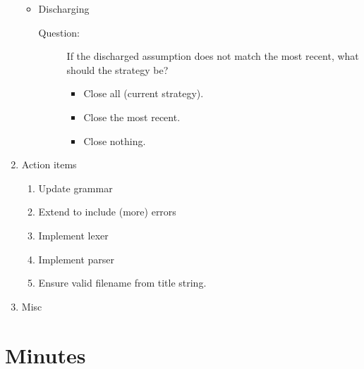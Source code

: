 \documentclass[a4paper]{article}
\begin{document}
\begin{enumerate}
\begin{itemize}
      \item Discharging
        \begin{description}
          \item[Question:] If the discharged assumption does not match the
          most recent, what should the strategy be?
            \begin{itemize}
              \item Close all (current strategy).
              \item Close the most recent.
              \item Close nothing.
            \end{itemize}
        \end{description}
    \end{itemize}
  \item Action items
    \begin{enumerate}[\HollowBox]
      \item Update grammar
      \item Extend to include (more) errors
      \item Implement lexer
      \item Implement parser
      \item Ensure valid filename from title
      string.
    \end{enumerate}
  \item Misc
\end{enumerate}

\newpage
\section{Minutes}
\end{document}
